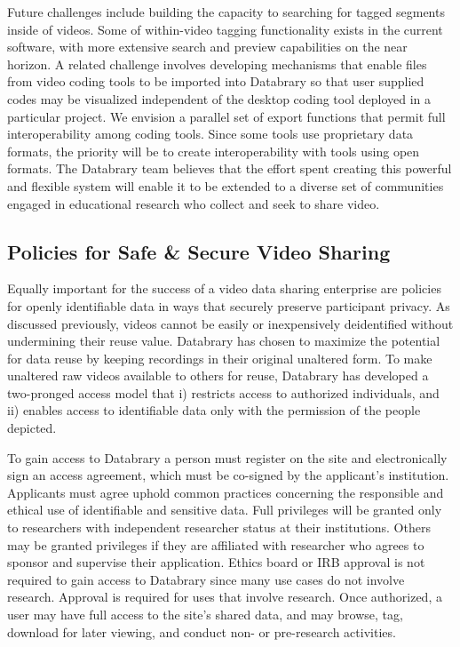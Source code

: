 \documentclass[letterpaper,man,apacite]{apa6}
\begin{document}
Future challenges include building the capacity to searching for tagged segments inside of videos.
Some of within-video tagging functionality exists in the current software, with more extensive search and preview capabilities on the near horizon.
A related challenge involves developing mechanisms that enable files from video coding tools to be imported into Databrary so that user supplied codes may be visualized independent of the desktop coding tool deployed in a particular project.
We envision a parallel set of export functions that permit full interoperability among coding tools.
Since some tools use proprietary data formats, the priority will be to create interoperability with tools using open formats.
The Databrary team believes that the effort spent creating this powerful and flexible system will enable it to be extended to a diverse set of communities engaged in educational research who collect and seek to share video.

\subsection{Policies for Safe \& Secure Video Sharing}

Equally important for the success of a video data sharing enterprise are policies for openly identifiable data in ways that securely preserve participant privacy.
As discussed previously, videos cannot be easily or inexpensively deidentified without undermining their reuse value.
Databrary has chosen to maximize the potential for data reuse by keeping recordings in their original
unaltered form.
To make unaltered raw videos available to others for reuse, Databrary has developed a two-pronged access model that i) restricts access to authorized individuals, and ii) enables access to identifiable data only with the permission of the people depicted.

To gain access to Databrary a person must register on the site and electronically sign an access agreement, which must be co-signed by the applicant's institution. 
Applicants must agree uphold common practices concerning the responsible and ethical use of identifiable and sensitive data. 
Full privileges will be granted only to researchers with independent researcher status at their institutions. 
Others may be granted privileges if they are affiliated with researcher who agrees to sponsor and supervise their application.
Ethics board or IRB approval is not required to gain access to Databrary since many use cases do not involve research.
Approval is required for uses that involve research.
Once authorized, a user may have full access to the site's shared data, and may browse, tag, download for later viewing, and conduct non- or pre-research activities. 
\end{document}
